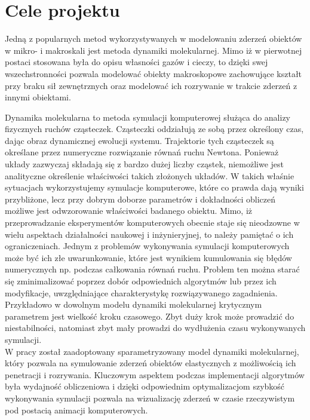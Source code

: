 \documentclass[12pt, letterpaper]{report}
\begin{document}
    \section{Cele projektu}
    Jedną z popularnych metod wykorzystywanych w modelowaniu zderzeń obiektów w mikro- i makroskali jest 
    metoda dynamiki molekularnej. Mimo iż w pierwotnej postaci stosowana była do opisu własności gazów i 
    cieczy, to dzięki swej wszechstronności pozwala modelować obiekty makroskopowe zachowujące kształt 
    przy braku sił zewnętrznych oraz modelować ich rozrywanie w trakcie zderzeń z innymi obiektami.

    Dynamika molekularna to metoda symulacji komputerowej służąca do analizy fizycznych ruchów cząsteczek. 
    Cząsteczki oddziałują ze sobą przez określony czas, dając obraz dynamicznej ewolucji systemu. 
    Trajektorie tych cząsteczek są określane przez numeryczne rozwiązanie równań ruchu Newtona. 
    Ponieważ układy zazwyczaj składają się z bardzo dużej liczby cząstek, niemożliwe jest analityczne 
    określenie właściwości takich złożonych układów. W takich właśnie sytuacjach wykorzystujemy 
    symulacje komputerowe, które co prawda dają wyniki przybliżone, lecz przy dobrym doborze 
    parametrów i dokładności obliczeń możliwe jest odwzorowanie właściwości badanego obiektu. 
    Mimo, iż przeprowadzanie eksperymentów komputerowych obecnie staje się nieodzowne w wielu 
    aspektach działalności naukowej i inżynieryjnej, to należy pamiętać o ich ograniczeniach. 
    Jednym z problemów wykonywania symulacji komputerowych może być ich złe uwarunkowanie, które 
    jest wynikiem kumulowania się błędów numerycznych np. podczas całkowania równań ruchu. 
    Problem ten można starać się zminimalizować poprzez dobór odpowiednich algorytmów lub 
    przez ich modyfikacje, uwzględniające charakterystykę rozwiązywanego zagadnienia. 
    Przykładowo w dowolnym modelu dynamiki molekularnej krytycznym parametrem jest wielkość 
    kroku czasowego. Zbyt duży krok może prowadzić do niestabilności, natomiast zbyt mały 
    prowadzi do wydłużenia czasu wykonywanych symulacji. \\
    
    W pracy został zaadoptowany sparametryzowany model dynamiki molekularnej, który pozwala na 
    symulowanie zderzeń obiektów elastycznych z możliwością ich penetracji i rozrywania. Kluczowym 
    aspektem podczas implementacji algorytmów była wydajność obliczeniowa i dzięki odpowiednim 
    optymalizacjom szybkość wykonywania symulacji pozwala na wizualizację zderzeń w czasie rzeczywistym 
    pod postacią animacji komputerowych.
\end{document}
